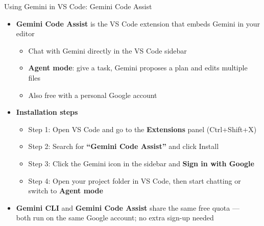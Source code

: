 \documentclass[hyperref={pdfpagelabels=false}]{beamer}
\begin{document}

\begin{frame}{Using Gemini in VS Code: Gemini Code Assist}

\begin{itemize}
	\item \textbf{Gemini Code Assist} is the VS Code extension that embeds Gemini in your editor
	\vspace{0.15cm}
	\begin{itemize}
		\item Chat with Gemini directly in the VS Code sidebar
		\vspace{0.1cm}
		\item \textbf{Agent mode}: give a task, Gemini proposes a plan and edits multiple files
		\vspace{0.1cm}
		\item Also free with a personal Google account
	\end{itemize}
	\vspace{0.3cm}
	\item \textbf{Installation steps}
	\vspace{0.1cm}
	\begin{itemize}
		\item Step 1: Open VS Code and go to the \textbf{Extensions} panel (Ctrl+Shift+X)
		\vspace{0.1cm}
		\item Step 2: Search for \textbf{``Gemini Code Assist''} and click Install
		\vspace{0.1cm}
		\item Step 3: Click the Gemini icon in the sidebar and \textbf{Sign in with Google}
		\vspace{0.1cm}
		\item Step 4: Open your project folder in VS Code, then start chatting or switch to \textbf{Agent mode}
	\end{itemize}
	\vspace{0.3cm}
	\item \textbf{Gemini CLI} and \textbf{Gemini Code Assist} share the same free quota ---\\
	      both run on the same Google account; no extra sign-up needed
\end{itemize}

\end{frame}
\end{document}
